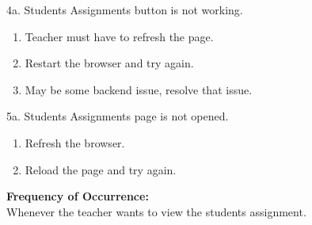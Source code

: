 4a. Students Assignments button is not working.
\begin{enumerate}
\item Teacher must have to refresh the page.
\item Restart the browser and try again.
\item May be some backend issue, resolve that issue.
\end{enumerate}
5a. Students Assignments page is not opened.
\begin{enumerate}
\item Refresh the browser.
\item Reload the page and try again.
\end{enumerate}
\textbf{Frequency of Occurrence:}\\
Whenever the teacher wants to view the students assignment.



